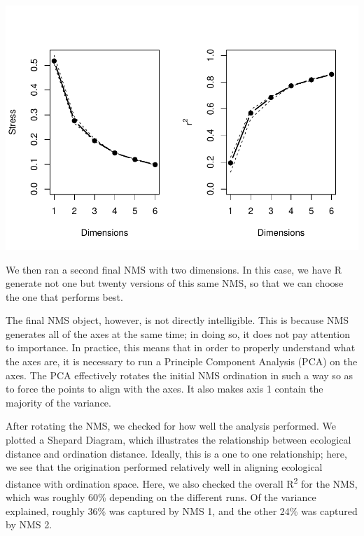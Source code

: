 \documentclass[
  12pt,
]{article}
\begin{document}
\includegraphics{ProjectDraft_files/figure-latex/unnamed-chunk-8-1.pdf}

We then ran a second final NMS with two dimensions. In this case, we
have R generate not one but twenty versions of this same NMS, so that we
can choose the one that performs best.

The final NMS object, however, is not directly intelligible. This is
because NMS generates all of the axes at the same time; in doing so, it
does not pay attention to importance. In practice, this means that in
order to properly understand what the axes are, it is necessary to run a
Principle Component Analysis (PCA) on the axes. The PCA effectively
rotates the initial NMS ordination in such a way so as to force the
points to align with the axes. It also makes axis 1 contain the majority
of the variance.

After rotating the NMS, we checked for how well the analysis performed.
We plotted a Shepard Diagram, which illustrates the relationship between
ecological distance and ordination distance. Ideally, this is a one to
one relationship; here, we see that the origination performed relatively
well in aligning ecological distance with ordination space. Here, we
also checked the overall R\textsuperscript{2} for the NMS, which was
roughly 60\% depending on the different runs. Of the variance explained,
roughly 36\% was captured by NMS 1, and the other 24\% was captured by
NMS 2.
\end{document}
